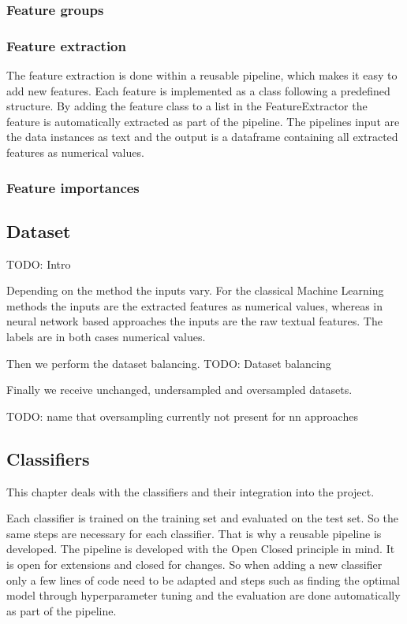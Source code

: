\subsubsection*{Feature groups}

\subsubsection*{Feature extraction}
The feature extraction is done within a reusable pipeline, which makes it easy to add new features. Each feature is implemented as a class following a predefined structure. By adding the feature class to a list in the Feature\-Extractor the feature is automatically extracted as part of the pipeline. The pipelines input are the data instances as text and the output is a dataframe containing all extracted features as numerical values.

\subsubsection*{Feature importances}


\subsection{Dataset}
\label{ch:approachD}

TODO: Intro

Depending on the method the inputs vary. For the classical Machine Learning methods the inputs are the extracted features as numerical values, whereas in neural network based approaches the inputs are the raw textual features. The labels are in both cases numerical values.

Then we perform the dataset balancing.
TODO: Dataset balancing


Finally we receive unchanged, undersampled and oversampled datasets.

TODO: name that oversampling currently not present for nn approaches


\subsection{Classifiers}
\label{ch:approachE}

This chapter deals with the classifiers and their integration into the project.

Each classifier is trained on the training set and evaluated on the test set. So the same steps are necessary for each classifier. That is why a reusable pipeline is developed. The pipeline is developed with the Open Closed principle in mind. It is open for extensions and closed for changes. So when adding a new classifier only a few lines of code need to be adapted and steps such as finding the optimal model through hyperparameter tuning and the evaluation are done automatically as part of the pipeline.

